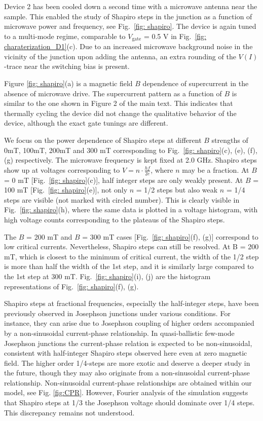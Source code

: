 Device 2 has been cooled down a second time with a microwave antenna near the sample.
This enabled the study of Shapiro steps in the junction as a function of microwave power and frequency, see Fig.~\ref{fig: shapiro}.
The device is again tuned to a multi-mode regime, comparable to $V_\mathrm{gate}$ = 0.5 V in Fig.~\ref{fig: charaterization_D1}(c).
Due to an increased microwave background noise in the vicinity of the junction upon adding the antenna, an extra rounding of the $V\left(I\right)$-trace near the switching bias is present.

Figure \ref{fig: shapiro}(a) is a magnetic field $B$ dependence of supercurrent in the absence of microwave drive.
The supercurrent pattern as a function of $B$ is similar to the one shown in Figure 2 of the main text.
This indicates that thermally cycling the device did not change the qualitative behavior of the device, although the exact gate tunings are different.

We focus on the power dependence of Shapiro steps at different $B$ strengths of 0mT, 100mT, 200mT and 300 mT corresponding to Fig.~\ref{fig: shapiro}(c), (e), (f), (g) respectively.
The microwave frequency is kept fixed at 2.0 GHz. Shapiro steps show up at voltages corresponding to $V=n\cdot\frac{hf}{2e}$, where $n$ may be a fraction. At $B$ = 0 mT [Fig.~\ref{fig: shapiro}(c)], half integer steps are only weakly present.
At $B$ = 100 mT [Fig.~\ref{fig: shapiro}(e)], not only $n$ = 1/2 steps but also weak $n$ = 1/4 steps are visible (not marked with circled number).
This is clearly visible in Fig.~\ref{fig: shapiro}(h), where the same data is plotted in a voltage histogram, with high voltage counts corresponding to the plateaus of the Shapiro steps.

The $B$ = 200 mT and $B$ = 300 mT cases [Fig.~\ref{fig: shapiro}(f), (g)] correspond to low critical currents. Nevertheless, Shapiro steps can still be resolved. At B = 200 mT, which is closest to the minimum of critical current, the width of the 1/2 step is more than half the width of the 1st step, and it is similarly large compared to the 1st step at 300 mT. Fig.~\ref{fig: shapiro}(i), (j) are the histogram representations of Fig.~\ref{fig: shapiro}(f), (g).

Shapiro steps at fractional frequencies, especially the half-integer steps, have been previously observed in Josephson junctions under various conditions\cite{Lehnert1999,Dubos2001, DinsmoreIII2008,Sellier2004,Chauvin2006}.
For instance, they can arise due to Josephson coupling of higher orders accompanied by a non-sinusoidal current-phase relationship\cite{Radovifmmodecuteclseci2001}.
In quasi-ballistic few-mode Josephson junctions the current-phase relation is expected to be non-sinusoidal, consistent with half-integer Shapiro steps observed here even at zero magnetic field.
The higher order 1/4-steps are more exotic and deserve a deeper study in the future, though they may also originate from a non-sinusoidal current-phase relationship.
Non-sinusoidal current-phase relationships are obtained within our model, see Fig. \ref{fig:CPR}. However, Fourier analysis of the simulation suggests that Shapiro steps at 1/3 the Josephson voltage should dominate over 1/4 steps. This discrepancy remains not understood.

